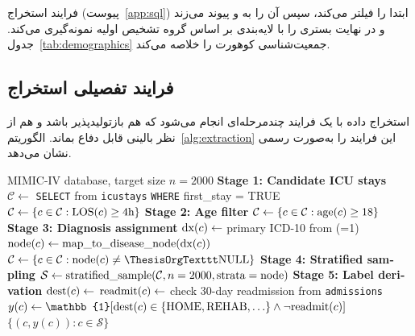 فرایند استخراج (پیوست~\ref{app:sql}) ابتدا \texttt{} را فیلتر می‌کند، سپس آن را به \texttt{} و \texttt{} پیوند می‌زند و در نهایت  بستری را با لایه‌بندی بر اساس گروه تشخیص اولیه نمونه‌گیری می‌کند. جدول~\ref{tab:demographics} جمعیت‌شناسی کوهورت را خلاصه می‌کند.



\subsection{فرایند تفصیلی استخراج }

استخراج داده با یک فرایند چندمرحله‌ای  انجام می‌شود که هم بازتولیدپذیر باشد و هم از نظر بالینی قابل دفاع بماند. الگوریتم~\ref{alg:extraction} این فرایند را به‌صورت رسمی نشان می‌دهد.

\begin{algorithm}[htbp]
\begin{latin}\footnotesize
\caption{فرایند استخراج کوهورت }
\label{alg:extraction}
\begin{algorithmic}[1]
\Require MIMIC-IV database, target size $n=2000$
\State \textbf{Stage 1: Candidate ICU stays}
\State $\mathcal{C} \gets$ \texttt{SELECT} from \texttt{icustays} \texttt{WHERE} first\_stay = TRUE
\State $\mathcal{C} \gets \{c \in \mathcal{C} : \text{LOS}(c) \geq 4\text{h}\}$
\State \textbf{Stage 2: Age filter}
\State $\mathcal{C} \gets \{c \in \mathcal{C} : \text{age}(c) \geq 18\}$ 
\State \textbf{Stage 3: Diagnosis assignment}
\State $\text{dx}(c) \gets$ primary ICD-10 from \texttt{} (\texttt{}=1)
\State $\text{node}(c) \gets \text{map\_to\_disease\_node}(\text{dx}(c))$
\EndFor
\State $\mathcal{C} \gets \{c \in \mathcal{C} : \text{\lr{node}}(c) \neq \texttt{NULL}\}$
\State \textbf{Stage 4: Stratified sampling}
\State $\mathcal{S} \gets \text{stratified\_sample}(\mathcal{C}, n=2000, \text{strata}=\text{node})$
\State \textbf{Stage 5: Label derivation}
\State $\text{dest}(c) \gets$ \texttt{}
\State $\text{readmit}(c) \gets$ check 30-day readmission from \texttt{admissions}
\State $y(c) \gets \mathbb{1}[\text{\lr{dest}}(c) \in \{\text{\lr{HOME}}, \text{\lr{REHAB}}, \ldots\} \land \neg\text{\lr{readmit}}(c)]$
\EndFor
\State \Return $\{(c, y(c)) : c \in \mathcal{S}\}$
\end{algorithmic}
\end{latin}
\end{algorithm}

